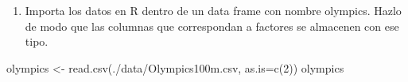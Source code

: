 \documentclass[
]{article}
\newenvironment{Shaded}{\begin{snugshade}}{\end{snugshade}}
\newcommand{\AttributeTok}[1]{\textcolor[rgb]{0.77,0.63,0.00}{#1}}
\newcommand{\DecValTok}[1]{\textcolor[rgb]{0.00,0.00,0.81}{#1}}
\newcommand{\FunctionTok}[1]{\textcolor[rgb]{0.00,0.00,0.00}{#1}}
\newcommand{\NormalTok}[1]{#1}
\newcommand{\OtherTok}[1]{\textcolor[rgb]{0.56,0.35,0.01}{#1}}
\newcommand{\StringTok}[1]{\textcolor[rgb]{0.31,0.60,0.02}{#1}}
\providecommand{\tightlist}{%
  \setlength{\itemsep}{0pt}\setlength{\parskip}{0pt}}
\begin{document}
\begin{enumerate}
\def\labelenumi{\arabic{enumi}.}
\tightlist
\item
  Importa los datos en R dentro de un data frame con nombre olympics.
  Hazlo de modo que las columnas que correspondan a factores se
  almacenen con ese tipo.
\end{enumerate}

\begin{Shaded}
\begin{Highlighting}[]
\NormalTok{olympics }\OtherTok{\textless{}{-}} \FunctionTok{read.csv}\NormalTok{(}\StringTok{\textquotesingle{}./data/Olympics100m.csv\textquotesingle{}}\NormalTok{, }\AttributeTok{as.is=}\FunctionTok{c}\NormalTok{(}\DecValTok{2}\NormalTok{))}
\NormalTok{olympics}
\end{Highlighting}
\end{Shaded}
\end{document}
